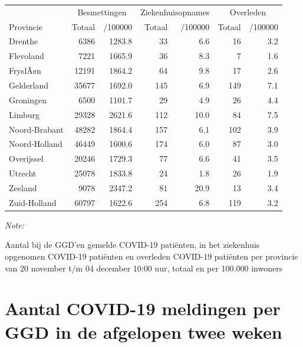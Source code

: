 \documentclass[
  english,
  man,floatsintext]{apa6}
\begin{document}
\begin{table}
\centering
\begin{threeparttable}
\begin{tabular}{lrrrrrr}
\toprule
\multicolumn{1}{c}{ } & \multicolumn{2}{c}{Besmettingen} & \multicolumn{2}{c}{Ziekenhuisopnames} & \multicolumn{2}{c}{Overleden} \\
\cmidrule(l{3pt}r{3pt}){2-3} \cmidrule(l{3pt}r{3pt}){4-5} \cmidrule(l{3pt}r{3pt}){6-7}
Provincie & Totaal & /100000 & Totaal & /100000 & Totaal & /100000\\
\midrule
Drenthe & 6386 & 1283.8 & 33 & 6.6 & 16 & 3.2\\
Flevoland & 7221 & 1665.9 & 36 & 8.3 & 7 & 1.6\\
FryslÃ¢n & 12191 & 1864.2 & 64 & 9.8 & 17 & 2.6\\
Gelderland & 35677 & 1692.0 & 145 & 6.9 & 149 & 7.1\\
Groningen & 6500 & 1101.7 & 29 & 4.9 & 26 & 4.4\\
Limburg & 29328 & 2621.6 & 112 & 10.0 & 84 & 7.5\\
Noord-Brabant & 48282 & 1864.4 & 157 & 6.1 & 102 & 3.9\\
Noord-Holland & 46449 & 1600.6 & 174 & 6.0 & 87 & 3.0\\
Overijssel & 20246 & 1729.3 & 77 & 6.6 & 41 & 3.5\\
Utrecht & 25078 & 1833.8 & 24 & 1.8 & 26 & 1.9\\
Zeeland & 9078 & 2347.2 & 81 & 20.9 & 13 & 3.4\\
Zuid-Holland & 60797 & 1622.6 & 254 & 6.8 & 119 & 3.2\\
\bottomrule
\end{tabular}
\begin{tablenotes}
\item \textit{Note: } 
\item Aantal bij de GGD’en gemelde COVID-19 patiënten, in het ziekenhuis opgenomen COVID-19 patiënten en overleden COVID-19 patiënten per provincie van 20 november t/m 04 december 10:00 uur, totaal en per 100.000 inwoners
\end{tablenotes}
\end{threeparttable}
\end{table}

\newpage

\hypertarget{aantal-covid-19-meldingen-per-ggd-in-de-afgelopen-twee-weken}{%
\section{Aantal COVID-19 meldingen per GGD in de afgelopen twee weken}\label{aantal-covid-19-meldingen-per-ggd-in-de-afgelopen-twee-weken}}
\end{document}
